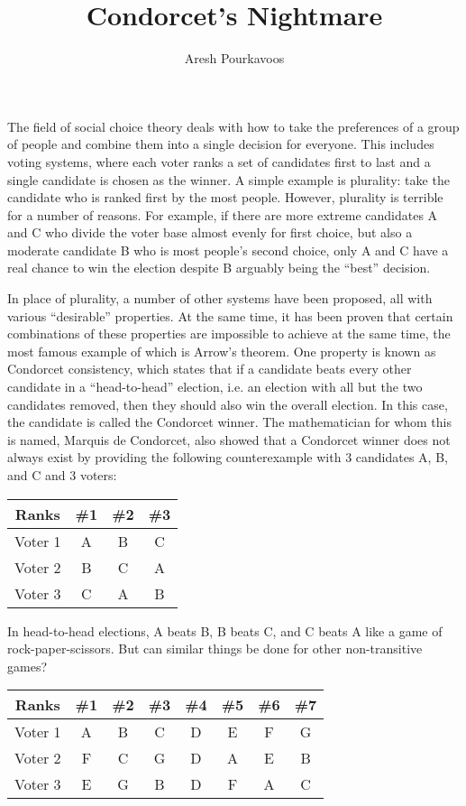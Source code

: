 \documentclass{article}
\begin{document}
\title{Condorcet's Nightmare}
\author{Aresh Pourkavoos}
\maketitle

The field of social choice theory deals with
how to take the preferences of a group of people
and combine them into a single decision for everyone.
This includes voting systems,
where each voter ranks a set of candidates first to last
and a single candidate is chosen as the winner.
A simple example is plurality:
take the candidate who is ranked first by the most people.
However, plurality is terrible for a number of reasons.
For example, if there are more extreme candidates A and C
who divide the voter base almost evenly for first choice,
but also a moderate candidate B who is most people's second choice,
only A and C have a real chance to win the election
despite B arguably being the ``best'' decision.

In place of plurality, a number of other systems have been proposed,
all with various ``desirable'' properties.
At the same time, it has been proven
that certain combinations of these properties are impossible to achieve at the same time,
the most famous example of which is Arrow's theorem.
One property is known as Condorcet consistency,
which states that if a candidate beats every other candidate in a ``head-to-head'' election,
i.e. an election with all but the two candidates removed,
then they should also win the overall election.
In this case, the candidate is called the Condorcet winner.
The mathematician for whom this is named, Marquis de Condorcet,
also showed that a Condorcet winner does not always exist
by providing the following counterexample
with 3 candidates A, B, and C and 3 voters:

\begin{center}
\begin{tabular}{|c|c c c|}
  \hline
  Ranks & \#1 & \#2 & \#3 \\ \hline
  Voter 1 & A & B & C \\ \hline
  Voter 2 & B & C & A \\ \hline
  Voter 3 & C & A & B \\ \hline
\end{tabular}
\end{center}

In head-to-head elections,
A beats B, B beats C, and C beats A
like a game of rock-paper-scissors.
But can similar things be done for other non-transitive games?

\begin{center}
\begin{tabular}{|c|c c c c c c c|}
  \hline
  Ranks & \#1 & \#2 & \#3 & \#4 & \#5 & \#6 & \#7 \\ \hline
  Voter 1 & A & B & C & D & E & F & G \\ \hline
  Voter 2 & F & C & G & D & A & E & B \\ \hline
  Voter 3 & E & G & B & D & F & A & C \\ \hline
\end{tabular}
\end{center}
\end{document}
